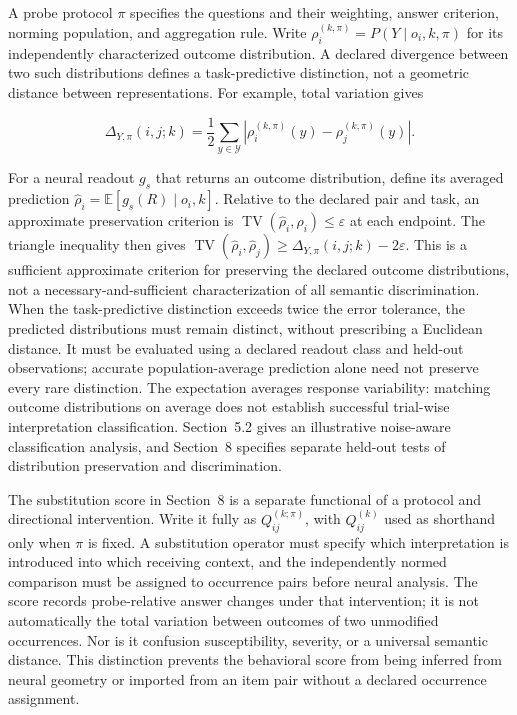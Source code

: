 \documentclass[11pt]{article}
\begin{document}
A probe protocol \(\pi\) specifies the questions and their weighting,
answer criterion, norming population, and aggregation rule. Write
\(\rho_i^{(k,\pi)}=P(Y\mid o_i,k,\pi)\) for its independently
characterized outcome distribution. A declared divergence between two
such distributions defines a task-predictive distinction, not a
geometric distance between representations. For example, total variation
gives

\begin{equation}
\Delta_{Y,\pi}(i,j;k)
=\frac12\sum_{y\in\mathcal Y}
\left|\rho_i^{(k,\pi)}(y)-\rho_j^{(k,\pi)}(y)\right|.
\end{equation}

For a neural readout \(g_s\) that returns an outcome distribution,
define its averaged prediction
\(\widehat\rho_i=\mathbb E[g_s(R)\mid o_i,k]\). Relative to the declared
pair and task, an approximate preservation criterion is
\(\operatorname{TV}(\widehat\rho_i,\rho_i)\le\varepsilon\) at each
endpoint. The triangle inequality then gives
\(\operatorname{TV}(\widehat\rho_i,\widehat\rho_j)\ge\Delta_{Y,\pi}(i,j;k)-2\varepsilon\).
This is a sufficient approximate criterion for preserving the declared
outcome distributions, not a necessary-and-sufficient characterization
of all semantic discrimination. When the task-predictive distinction
exceeds twice the error tolerance, the predicted distributions must
remain distinct, without prescribing a Euclidean distance. It must be
evaluated using a declared readout class and held-out observations;
accurate population-average prediction alone need not preserve every
rare distinction. The expectation averages response variability:
matching outcome distributions on average does not establish successful
trial-wise interpretation classification. Section~5.2 gives an
illustrative noise-aware classification analysis, and Section~8
specifies separate held-out tests of distribution preservation and
discrimination.

The substitution score in Section~8 is a separate functional of a
protocol and directional intervention. Write it fully as
\(Q_{ij}^{(k;\pi)}\), with \(Q_{ij}^{(k)}\) used as shorthand only when
\(\pi\) is fixed. A substitution operator must specify which
interpretation is introduced into which receiving context, and the
independently normed comparison must be assigned to occurrence pairs
before neural analysis. The score records probe-relative answer changes
under that intervention; it is not automatically the total variation
between outcomes of two unmodified occurrences. Nor is it confusion
susceptibility, severity, or a universal semantic distance. This
distinction prevents the behavioral score from being inferred from
neural geometry or imported from an item pair without a declared
occurrence assignment.
\end{document}
